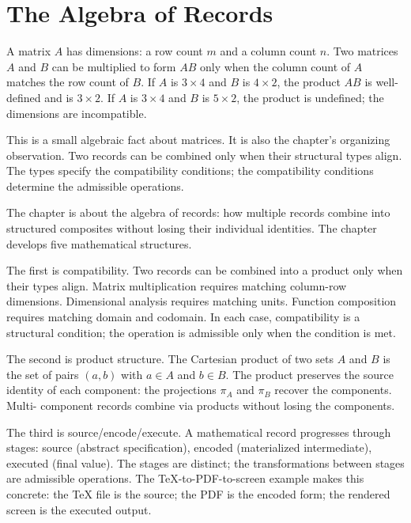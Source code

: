 \chapter{The Algebra of Records}
\label{chap:algebra-of-records}


\begin{chapteressay}

A matrix $A$ has dimensions: a row count $m$ and a column count $n$.
Two matrices $A$ and $B$ can be multiplied to form $AB$ only when the
column count of $A$ matches the row count of $B$. If $A$ is $3 \times
4$ and $B$ is $4 \times 2$, the product $AB$ is well-defined and is
$3 \times 2$. If $A$ is $3 \times 4$ and $B$ is $5 \times 2$, the
product is undefined; the dimensions are incompatible.

This is a small algebraic fact about matrices. It is also the
chapter's organizing observation. Two records can be combined only
when their structural types align. The types specify the
compatibility conditions; the compatibility conditions determine the
admissible operations.

The chapter is about the algebra of records: how multiple records
combine into structured composites without losing their individual
identities. The chapter develops five mathematical structures.

The first is compatibility. Two records can be combined into a
product only when their types align. Matrix multiplication requires
matching column-row dimensions. Dimensional analysis requires
matching units. Function composition requires matching domain and
codomain. In each case, compatibility is a structural condition;
the operation is admissible only when the condition is met.

The second is product structure. The Cartesian product of two sets
$A$ and $B$ is the set of pairs $(a, b)$ with $a \in A$ and $b \in
B$. The product preserves the source identity of each component: the
projections $\pi_A$ and $\pi_B$ recover the components. Multi-
component records combine via products without losing the components.

The third is source/encode/execute. A mathematical record progresses
through stages: source (abstract specification), encoded
(materialized intermediate), executed (final value). The stages are
distinct; the transformations between stages are admissible
operations. The TeX-to-PDF-to-screen example makes this concrete:
the TeX file is the source; the PDF is the encoded form; the
rendered screen is the executed output.


\end{chapteressay}
